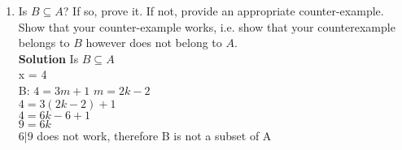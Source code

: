 \documentclass[12pt]{article}
\begin{document}
\begin{enumerate}
\begin{enumerate}
        \\
        \\
        
        \item  Is $B \subseteq A$?  If so, prove it.  If not, provide an appropriate counter-example.  Show that your counter-example works, i.e. show that your counterexample belongs to $B$ however does not belong to $A$.  \\
        
        \textbf{Solution} Is $B \subseteq A$ \\
        x = 4 \\
        B: $4 = 3m +1$ \;\;\; $ m = 2k-2$ \\
        $4 = 3(2k - 2) +1$ \\ 
        $4 = 6k -6 +1$ \\
        $9 = 6k$  \\
        $6|9$ does not work, therefore B is not a subset of A \\
        \square
        
    \end{enumerate}
    \end{enumerate}
\end{document}
